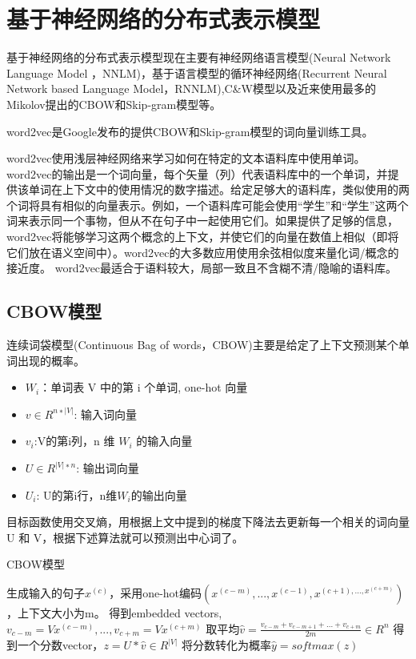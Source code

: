 \documentclass[a4paper,AutoFakeBold,oneside,12pt]{book}
\begin{document}
\section{基于神经网络的分布式表示模型}

基于神经网络的分布式表示模型现在主要有神经网络语言模型(Neural Network Language Model ，NNLM)，基于语言模型的循环神经网络(Recurrent Neural Network based Language Model，RNNLM),C\&W模型以及近来使用最多的Mikolov提出的CBOW和Skip-gram模型等。

word2vec是Google发布的提供CBOW和Skip-gram模型的词向量训练工具。

word2vec使用浅层神经网络来学习如何在特定的文本语料库中使用单词。 word2vec的输出是一个词向量，每个矢量（列）代表语料库中的一个单词，并提供该单词在上下文中的使用情况的数字描述。给定足够大的语料库，类似使用的两个词将具有相似的向量表示。例如，一个语料库可能会使用“学生”和“学生”这两个词来表示同一个事物，但从不在句子中一起使用它们。如果提供了足够的信息，word2vec将能够学习这两个概念的上下文，并使它们的向量在数值上相似（即将它们放在语义空间中）。word2vec的大多数应用使用余弦相似度来量化词/概念的接近度。 word2vec最适合于语料较大，局部一致且不含糊不清/隐喻的语料库。

\subsection{CBOW模型}
连续词袋模型(Continuous Bag of words，CBOW)主要是给定了上下文预测某个单词出现的概率。


\begin{itemize}
    \item $W_i$：单词表 V 中的第 i 个单词, one-hot 向量
    \item $v \in R^{n∗|V|}$: 输入词向量
    \item $v_i$:V的第i列，n 维 $W_i$ 的输入向量
    \item $U \in R^{|V|∗n}$: 输出词向量
    \item $U_i$: U的第i行，n维$W_i$的输出向量
\end{itemize}

目标函数使用交叉熵，用根据上文中提到的梯度下降法去更新每一个相关的词向量 U 和 V，根据下述算法就可以预测出中心词了。

\begin{algorithm}
\caption{CBOW模型}
\label{CBOW_algorithm}
\begin{algorithmic}[1]
\State 生成输入的句子$x^{(c)}$，采用one-hot编码$(x^{(c-m)},...,x^{(c-1)},x^{(c+1),...,x^{(c+m)}})$，上下文大小为m。
\State 得到embedded vectors,$v_{c-m}=V x^{(c-m)}, ... ,v_{c+m}=Vx^{(c+m)}$
\State 取平均$\hat{v}=\frac{v_{c-m}+v_{c-m+1}+...+v_{c+m}}{2m}\in R^{n}$
\State 得到一个分数vector，$z=U*\hat{v}\in R^{|V|}$
\State 将分数转化为概率$\hat{y}=softmax(z)$
\end{algorithmic}
\end{algorithm}
\end{document}
